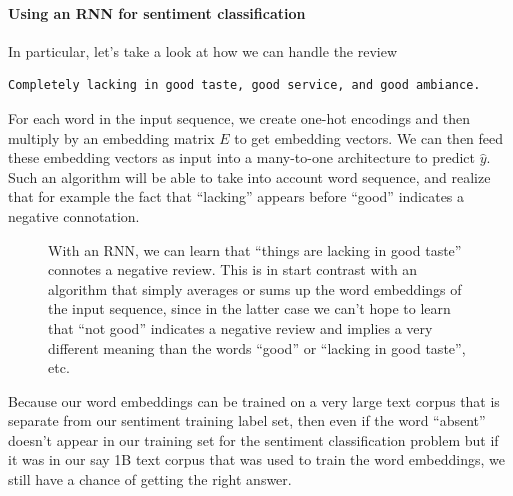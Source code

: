 \documentclass[12pt]{article}
\begin{document}
\paragraph{Using an RNN for sentiment classification}
In particular, let's take a look at how we can handle the review
\begin{verbatim}
Completely lacking in good taste, good service, and good ambiance.
\end{verbatim}
For each word in the input sequence, we create one-hot encodings and then multiply by an embedding matrix $E$ to get embedding vectors. We can then feed these embedding vectors as input into a many-to-one architecture to predict $\hat y$. Such an algorithm will be able to take into account word sequence, and realize that for example the fact that ``lacking'' appears before ``good'' indicates a negative connotation.

\begin{figure}[h]
  \centering
  \caption{\footnotesize With an RNN, we can learn that ``things are lacking in good taste'' connotes a negative review. This is in start contrast with an algorithm that simply averages or sums up the word embeddings of the input sequence, since in the latter case we can't hope to learn that ``not good'' indicates a negative review and implies a very different meaning than the words ``good'' or ``lacking in good taste'', etc.}
\end{figure}
Because our word embeddings can be trained on a very large text corpus that is separate from our sentiment training label set, then even if the word ``absent'' doesn't appear in our training set for the sentiment classification problem but if it was in our say 1B text corpus that was used to train the word embeddings, we still have a chance of getting the right answer.
\end{document}
